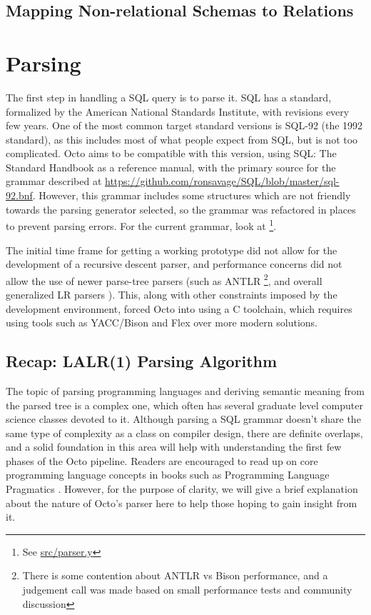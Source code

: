 \documentclass[]{article}
\newcommand{\gitlab}[1]{\footnote{See \href{https://gitlab.com/YottaDB/DBMS/YDBOcto/blob/master/#1}{#1}}}
\begin{document}
\subsection{Mapping Non-relational Schemas to Relations} \label{sec:background_mapping}

\section{Parsing} \label{sec:parsing}

The first step in handling a SQL query is to parse it.
SQL has a standard, formalized by the American National Standards Institute, with revisions every few years.
One of the most common target standard versions is SQL-92 (the 1992 standard), as this includes most of what people expect from SQL, but is not too complicated.
Octo aims to be compatible with this version, using SQL: The Standard Handbook \cite{cannan1993sql} as a reference manual, with the primary source for the grammar described at \url{https://github.com/ronsavage/SQL/blob/master/sql-92.bnf}\cite{ronsavage2003sql}.
However, this grammar includes some structures which are not friendly towards the parsing generator selected, so the grammar was refactored in places to prevent parsing errors.
For the current grammar, look at \gitlab{src/parser.y}.

The initial time frame for getting a working prototype did not allow for the development of a recursive descent parser, and performance concerns did not allow the use of newer parse-tree parsers (such as ANTLR \cite{parr2013definitive} \footnote{There is some contention about ANTLR vs Bison performance, and a judgement call was made based on small performance tests and community discussion}, and overall generalized LR parsers \cite{lang1974deterministic}).
This, along with other constraints imposed by the development environment, forced Octo into using a C toolchain, which requires using tools such as YACC/Bison and Flex over more modern solutions.

\subsection{Recap: LALR(1) Parsing Algorithm}

The topic of parsing programming languages and deriving semantic meaning from the parsed tree is a complex one, which often has several graduate level computer science classes devoted to it.
Although parsing a SQL grammar doesn't share the same type of complexity as a class on compiler design, there are definite overlaps, and a solid foundation in this area will help with understanding the first few phases of the Octo pipeline.
Readers are encouraged to read up on core programming language concepts in books such as Programming Language Pragmatics \cite{scott2000programming}.
However, for the purpose of clarity, we will give a brief explanation about the nature of Octo's parser here to help those hoping to gain insight from it.
\end{document}
